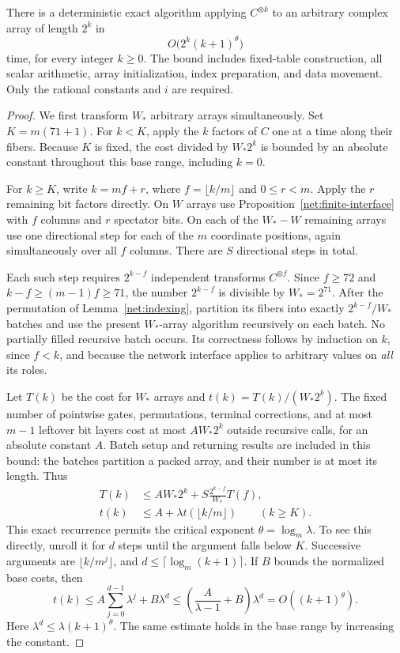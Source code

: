 \begin{samepage}
\begin{theorem}\label{net:tensor-bound}
There is a deterministic exact algorithm applying $C^{\otimes k}$
to an arbitrary complex array of length $2^k$ in
\[
 O\bigl(2^k(k+1)^\theta\bigr)
\]
time, for every integer $k\ge0$.  The bound includes fixed-table
construction, all scalar arithmetic, array initialization, index
preparation, and data movement.  Only the rational constants and
$i$ are required.
\end{theorem}
\end{samepage}

\begin{proof}
We first transform $W_*$ arbitrary arrays simultaneously.  Set
$K=m(71+1)$.  For $k<K$, apply the $k$ factors of $C$ one at a
time along their fibers.  Because $K$ is fixed, the cost divided
by $W_*2^k$ is bounded by an absolute constant throughout this
base range, including $k=0$.

For $k\ge K$, write $k=mf+r$, where $f=\lfloor k/m\rfloor$
and $0\le r<m$.  Apply the $r$ remaining bit factors directly.
On $W$ arrays use Proposition~\ref{net:finite-interface} with
$f$ columns and $r$ spectator bits.  On each of the $W_*-W$
remaining arrays use one directional step for each of the $m$
coordinate positions, again simultaneously over all $f$ columns.
There are $S$ directional steps in total.

Each such step requires $2^{k-f}$ independent transforms
$C^{\otimes f}$.  Since $f\ge72$ and
$k-f\ge(m-1)f\ge71$, the number $2^{k-f}$ is divisible by
$W_*=2^{71}$.  After the permutation of
Lemma~\ref{net:indexing}, partition its fibers into exactly
$2^{k-f}/W_*$ batches and use the present $W_*$-array algorithm
recursively on each batch.  No partially filled recursive batch
occurs.  Its correctness follows by induction on $k$, since
$f<k$, and because the network interface applies to arbitrary
values on \emph{all} its roles.

Let $T(k)$ be the cost for $W_*$ arrays and
$t(k)=T(k)/(W_*2^k)$.  The fixed number of pointwise gates,
permutations, terminal corrections, and at most $m-1$ leftover
bit layers cost at most $A W_*2^k$ outside recursive calls,
for an absolute constant $A$.  Batch setup and returning results
are included in this bound: the batches partition a packed array,
and their number is at most its length.  Thus
\begin{align*}
 T(k)&\le A W_*2^k+
          S\frac{2^{k-f}}{W_*}T(f),\\
 t(k)&\le A+\lambda t(\lfloor k/m\rfloor)
                   \qquad(k\ge K).
\end{align*}
This exact recurrence permits the critical exponent
$\theta=\log_m\lambda$.  To see this directly, unroll it for
$d$ steps until the argument falls below $K$.  Successive
arguments are $\lfloor k/m^j\rfloor$, and
$d\le\lceil\log_m(k+1)\rceil$.  If $B$ bounds the normalized
base costs, then
\[
 t(k)\le A\sum_{j=0}^{d-1}\lambda^j+B\lambda^d
       \le\left(\frac{A}{\lambda-1}+B\right)\lambda^d
       =O((k+1)^\theta).
\]
Here $\lambda^d\le\lambda(k+1)^\theta$.  The same estimate
holds in the base range by increasing the constant.


\end{proof}
